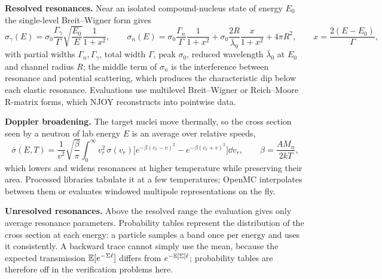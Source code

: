 \textbf{Resolved resonances.} Near an isolated compound-nucleus state of energy $E_0$ the
single-level Breit--Wigner form gives
\begin{equation}
\sigma_\gamma(E)=\sigma_0\frac{\Gamma_\gamma}{\Gamma}\sqrt{\frac{E_0}{E}}\frac{1}{1+x^2},\qquad
\sigma_n(E)=\sigma_0\frac{\Gamma_n}{\Gamma}\frac{1}{1+x^2}+\sigma_0\frac{2R}{\bar\lambda_0}\frac{x}{1+x^2}+4\pi R^2,
\qquad x=\frac{2(E-E_0)}{\Gamma},
\end{equation}
with partial widths $\Gamma_n,\Gamma_\gamma$, total width $\Gamma$, peak $\sigma_0$, reduced wavelength $\bar\lambda_0$ at $E_0$ and channel radius
$R$; the middle term of $\sigma_n$ is the interference between resonance and potential scattering,
which produces the characteristic dip below each elastic resonance. Evaluations use multilevel
Breit--Wigner or Reich--Moore R-matrix forms, which NJOY reconstructs into pointwise data.

\textbf{Doppler broadening.} The target nuclei move thermally, so the cross section seen by a neutron
of lab energy $E$ is an average over relative speeds,
\begin{equation}
\bar\sigma(E,T)=\frac{1}{v^2}\sqrt{\frac{\beta}{\pi}}\int_0^\infty v_r^2\,\sigma(v_r)
\Big[e^{-\beta(v_r-v)^2}-e^{-\beta(v_r+v)^2}\Big]\dd v_r,\qquad\beta=\frac{AM_n}{2kT},
\end{equation}
which lowers and widens resonances at higher temperature while preserving their area. Processed
libraries tabulate it at a few temperatures; OpenMC interpolates between them or evaluates windowed
multipole representations on the fly.

\textbf{Unresolved resonances.} Above the resolved range the evaluation gives only average resonance
parameters. Probability tables represent the distribution of the cross section at each energy: a
particle samples a band once per energy and uses it consistently. A backward trace cannot simply use
the mean, because the expected transmission $\mathbb E[e^{-\Sigma\ell}]$ differs from $e^{-\mathbb E[\Sigma]\ell}$;
probability tables are therefore off in the verification problems here.

